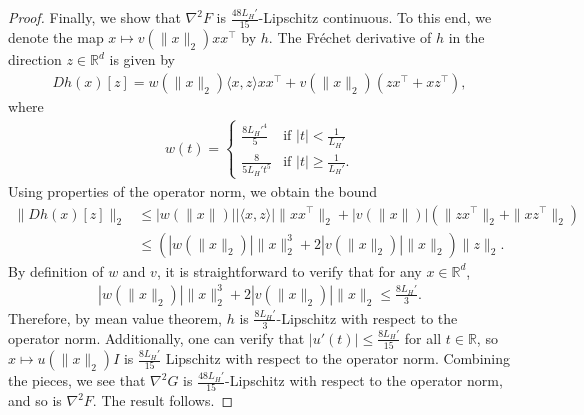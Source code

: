 \documentclass[10pt,a4paper]{amsart}
\newcommand{\RR}{\mathbb{R}}
\newcommand{\liph}{L_H}
\begin{document}
\begin{proof}
	Finally, we show that $\nabla^2  F$ is $\frac{48\liph'}{15}$-Lipschitz continuous. To this end, we denote the map $x \mapsto v(\|x\|_2) xx^\top$ by $h$. The Fr\'echet derivative of $h$ in the direction \(z\in\mathbb{R}^d\) is given by
	\begin{align*}
		Dh(x)[z] = w(\|x\|_2) \langle x, z \rangle xx^\top + v(\|x\|_2)\left(zx^\top + xz^\top\right),
	\end{align*}
	where 
	\begin{align*}
		w(t) = \begin{cases}
			\frac{8\liph'^4 }{5}  & \text{if } |t| < \frac{1}{\liph'}\\
			\frac{8}{5 \liph' t^5}  & \text{if } |t| \ge \frac{1}{\liph'}. 
		\end{cases}
	\end{align*}
	Using properties of the operator norm, we obtain the bound
	\begin{align*}
		\|Dh(x)[z]\|_2 & \le |w(\|x\|)| |\langle x, z \rangle| \|xx^\top\|_2 + |v(\|x\|)|\left(\|zx^\top\|_2+\|xz^\top\|_2\right)\\
		&\le \left(|w(\|x\|_2)| \|x\|_2^3 + 2|v(\|x\|_2)| \|x\|_2  \right)\|z\|_2.
	\end{align*}
	By definition of $w$ and $v$, it is straightforward to verify that for any $x \in \RR^d$,
	\begin{align*}
		|w(\|x\|_2)| \|x\|_2^3 + 2|v(\|x\|_2)| \|x\|_2 \le \frac{8 \liph'}{3}.
	\end{align*}
	Therefore, by mean value theorem, $h$ is $\frac{8 \liph'}{3}$-Lipschitz with respect to the operator norm. Additionally, one can verify that $|u'(t)| \le \frac{8 \liph'}{15}$  for all $t \in \RR$, so $x \mapsto u(\|x\|_2) I$ is $\frac{8 \liph'}{15}$ Lipschitz with respect to the operator norm. Combining the pieces, we see that $\nabla^2 G$ is $\frac{48\liph'}{15}$-Lipschitz with respect to the operator norm, and so is $\nabla^2  F$. The result follows.
\end{proof}
\end{document}
